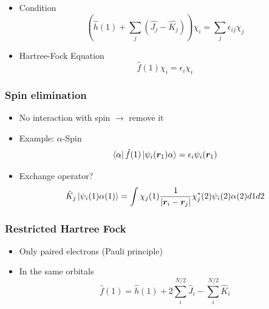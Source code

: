 \documentclass{beamer}
\begin{document}
\begin{frame}
    \begin{itemize}
        \item Condition
        \begin{equation*}
            \left(\hat{h}(1) + \sum_j(\hat{J_j} - \hat{K_j})\right)\chi_i = \sum_{j}\epsilon_{ij}\chi_j
        \end{equation*}
        \item Hartree-Fock Equation
        \begin{equation*}
            \hat{f}(1)\chi_i = \epsilon_i\chi_i
        \end{equation*}
    \end{itemize}
\end{frame}

\begin{frame}
    \frametitle{Spin elimination}
    \begin{itemize}
        \item No interaction with spin $\rightarrow$ remove it
        \item Example: $\alpha$-Spin
        \begin{equation*}
            \bra{\alpha}\hat{f}(1)\ket{\psi_i(\boldsymbol{r}_1)\alpha} = \epsilon_i\psi_i(\boldsymbol{r}_1)
        \end{equation*}
        \item Exchange operator?
        \begin{equation*}
            \hat{K}_j\ket{\psi_i(1)\alpha(1)} = \int\chi_j(1)\frac{1}{|\boldsymbol{r}_i - \boldsymbol{r}_j|}\chi_j^*(2)\psi_i(2)\alpha(2)d1d2
        \end{equation*}
    \end{itemize}
\end{frame}

\begin{frame}
    \frametitle{Restricted Hartree Fock}
    \begin{itemize}
        \item Only paired electrons (Pauli principle)
        \item In the same orbitals
        \begin{equation*}
            \hat{f}(1) = \hat{h}(1) + 2\sum_i^{N/2}\hat{J}_i - \sum_i^{N/2}\hat{K}_i
        \end{equation*}
    \end{itemize}
\end{frame}
\end{document}
